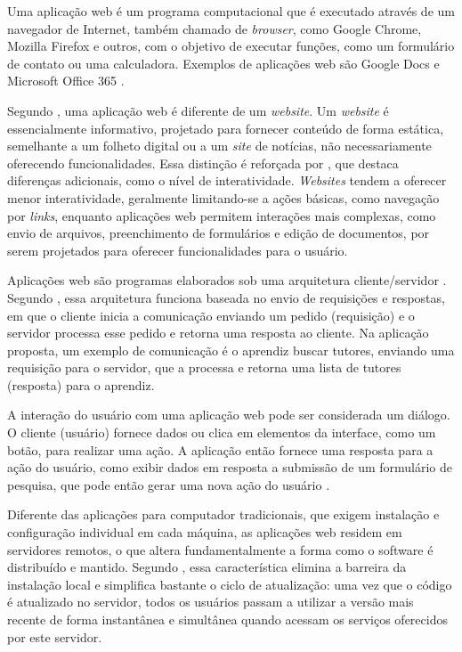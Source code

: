 Uma aplicação web é um programa computacional que é executado através de um navegador de Internet, também chamado de \textit{browser}, como Google Chrome, Mozilla Firefox e outros, com o objetivo de executar funções, como um formulário de contato ou uma calculadora. Exemplos de aplicações web são Google Docs e Microsoft Office 365 \cite{harwood2022internet}.

Segundo , uma aplicação web é diferente de um \textit{website}. Um \textit{website} é essencialmente informativo, projetado para fornecer conteúdo de forma estática, semelhante a um folheto digital ou a um \textit{site} de notícias, não necessariamente oferecendo funcionalidades. Essa distinção é reforçada por , que destaca diferenças adicionais, como o nível de interatividade. \textit{Websites} tendem a oferecer menor interatividade, geralmente limitando-se a ações básicas, como navegação por \textit{links}, enquanto aplicações web permitem interações mais complexas, como envio de arquivos, preenchimento de formulários e edição de documentos, por serem projetados para oferecer funcionalidades para o usuário. 

Aplicações web são programas elaborados sob uma arquitetura cliente/servidor \cite{shklar2009web}. Segundo , essa arquitetura funciona baseada no envio de requisições e respostas, em que o cliente inicia a comunicação enviando um pedido (requisição) e o servidor processa esse pedido e retorna uma resposta ao cliente. Na aplicação proposta, um exemplo de comunicação é o aprendiz buscar tutores, enviando uma requisição para o servidor, que a processa e retorna uma lista de tutores (resposta) para o aprendiz.

A interação do usuário com uma aplicação web pode ser considerada um diálogo. O cliente (usuário) fornece dados ou clica em elementos da interface, como um botão, para realizar uma ação. A aplicação então fornece uma resposta para a ação do usuário, como exibir dados em resposta a submissão de um formulário de pesquisa, que pode então gerar uma nova ação do usuário \cite{harwood2022internet}.

Diferente das aplicações para computador tradicionais, que exigem instalação e configuração individual em cada máquina, as aplicações web residem em servidores remotos, o que altera fundamentalmente a forma como o software é distribuído e mantido. Segundo , essa característica elimina a barreira da instalação local e simplifica bastante o ciclo de atualização: uma vez que o código é atualizado no servidor, todos os usuários passam a utilizar a versão mais recente de forma instantânea e simultânea quando acessam os serviços oferecidos por este servidor.

